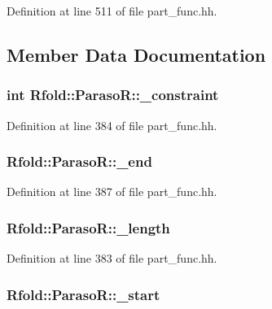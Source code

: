 Definition at line 511 of file part\+\_\+func.\+hh.



\subsection{Member Data Documentation}
\hypertarget{class_rfold_1_1_paraso_r_a869ef980793c7a669a5b89efdc107db5}{
\subsubsection[{\+\_\+constraint}]{\setlength{\rightskip}{0pt plus 5cm}int Rfold\+::\+Paraso\+R\+::\+\_\+constraint}}\label{class_rfold_1_1_paraso_r_a869ef980793c7a669a5b89efdc107db5}


Definition at line 384 of file part\+\_\+func.\+hh.

\hypertarget{class_rfold_1_1_paraso_r_aa0a39f36fc4917382d6e95174150791f}{
\subsubsection[{\+\_\+end}]{ Rfold\+::\+Paraso\+R\+::\+\_\+end}}\label{class_rfold_1_1_paraso_r_aa0a39f36fc4917382d6e95174150791f}


Definition at line 387 of file part\+\_\+func.\+hh.

\hypertarget{class_rfold_1_1_paraso_r_afcca775aebec2ac5d0f659ddb4f625c3}{
\subsubsection[{\+\_\+length}]{ Rfold\+::\+Paraso\+R\+::\+\_\+length}}\label{class_rfold_1_1_paraso_r_afcca775aebec2ac5d0f659ddb4f625c3}


Definition at line 383 of file part\+\_\+func.\+hh.

\hypertarget{class_rfold_1_1_paraso_r_a213a200c99cd89cf6a41715b9d1b4b05}{
\subsubsection[{\+\_\+start}]{ Rfold\+::\+Paraso\+R\+::\+\_\+start}}\label{class_rfold_1_1_paraso_r_a213a200c99cd89cf6a41715b9d1b4b05}


